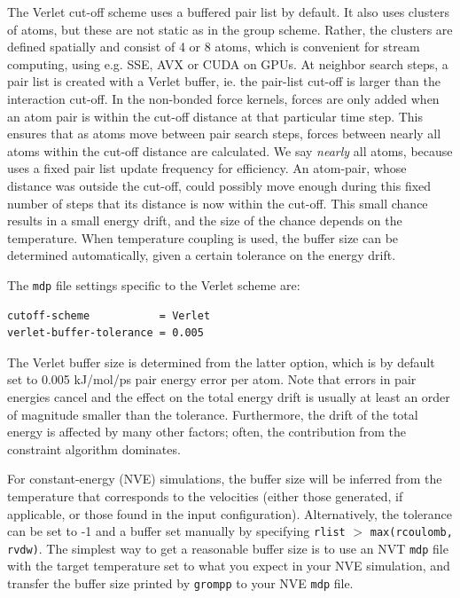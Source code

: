 The Verlet cut-off scheme uses a buffered pair list by default. It
also uses clusters of atoms, but these are not static as in the group
scheme. Rather, the clusters are defined spatially and consist of 4 or
8 atoms, which is convenient for stream computing, using e.g. SSE, AVX
or CUDA on GPUs. At neighbor search steps, a pair list is created
with a Verlet buffer, ie. the pair-list cut-off is larger than the
interaction cut-off. In the non-bonded force kernels, forces are only
added when an atom pair is within the cut-off distance at that
particular time step. This ensures that as atoms move between pair
search steps, forces between nearly all atoms within the cut-off
distance are calculated. We say {\em nearly} all atoms, because
{\gromacs} uses a fixed pair list update frequency for
efficiency. An atom-pair, whose distance was outside the cut-off,
could possibly move enough during this fixed number of
steps that its distance is now within the cut-off. This
small chance results in a small energy drift, and the size of the
chance depends on the temperature. When temperature
coupling is used, the buffer size can be determined automatically,
given a certain tolerance on the energy drift.

The {\tt mdp} file settings specific to the Verlet scheme are:
\begin{verbatim}
cutoff-scheme           = Verlet
verlet-buffer-tolerance = 0.005
\end{verbatim}
The Verlet buffer size is determined from the latter option, which is
by default set to 0.005 kJ/mol/ps pair energy error per atom. Note that
errors in pair energies cancel and the effect on the total energy drift
is usually at least an order of magnitude smaller than the tolerance.
Furthermore, the drift of the total energy is affected by many other
factors; often, the contribution from the constraint algorithm dominates.

For constant-energy (NVE) simulations, the buffer size will be
inferred from the temperature that corresponds to the velocities
(either those generated, if applicable, or those found in the input
configuration). Alternatively, the tolerance can be set to -1 and a
buffer set manually by specifying {\tt rlist} $>$ {\tt max(rcoulomb,
  rvdw)}. The simplest way to get a reasonable buffer size is to use
an NVT {\tt mdp} file with the target temperature set to what you
expect in your NVE simulation, and transfer the buffer size printed by
{\tt grompp} to your NVE {\tt mdp} file.

